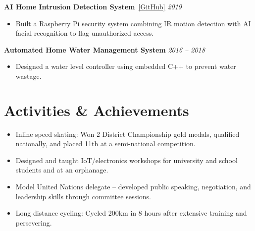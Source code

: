 \documentclass[11pt,letterpaper]{extarticle}
\newcommand{\project}[2]{%
    \vspace{15pt}
    \textbf{\large#1} \hfill \textit{#2}\\[-15pt]
}
\newcommand{\linkedproject}[4]{%
    \vspace{10pt}
    \textbf{\large #2}~{\small\href{#1}{[#4]}}
    \hfill
    \textit{#3}\\[-15pt]
}
\begin{document}
\linkedproject
    {https://github.com/Pranav2008-droid/home-security}
    {AI Home Intrusion Detection System}
    {2019}
    {GitHub}

\begin{itemize}
    \item Built a Raspberry Pi security system combining IR motion detection with AI facial recognition to flag unauthorized access.
\end{itemize}

\project
    {Automated Home Water Management System}
    {2016 -- 2018}

\begin{itemize}
    \item Designed a water level controller using embedded C++ to prevent water wastage. 
\end{itemize}

\section{Activities \& Achievements}

\begin{itemize}
    \item Inline speed skating: Won 2 District Championship gold medals, qualified nationally, and placed 11th at a semi-national competition.
    \item Designed and taught IoT/electronics workshops for university and school students and at an orphanage.
    \item Model United Nations delegate -- developed public speaking, negotiation, and leadership skills through committee sessions.
    \item Long distance cycling: Cycled 200km in 8 hours after extensive training and persevering. 
\end{itemize}
\end{document}
